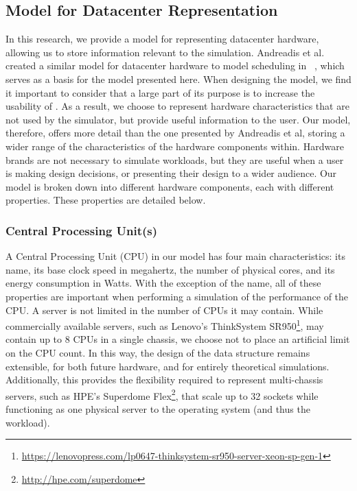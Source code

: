 \documentclass[11pt]{article}
\begin{document}
	\subsection{Model for Datacenter Representation}
		In this research, we provide a model for representing datacenter hardware, allowing us to store information  relevant to the simulation. Andreadis et al. created a similar model for datacenter hardware to model scheduling in \opendc{}~\cite{Andreadis2018}, which serves as a basis for the model presented here. 
		When designing the model, we find it important to consider that a large part of its purpose is to increase the usability of \opendc{}. 
		As a result, we choose to represent hardware characteristics that are not used by the simulator, but provide useful information to the user. 
		Our model, therefore, offers more detail than the one presented by Andreadis et al, storing a wider range of the characteristics of the hardware components within.
		Hardware brands are not necessary to simulate workloads, but they are useful when a user is making design decisions, or presenting their design to a wider audience.
		Our model is broken down into different hardware components, each with different properties.
		These properties are detailed below.

		\subsubsection{Central Processing Unit(s)}
			A Central Processing Unit (CPU) in our model has four main characteristics: its name, its base clock speed in megahertz, the number of physical cores, and its energy consumption in Watts.
			With the exception of the name, all of these properties are important when performing a simulation of the performance of the CPU.
			A server is not limited in the number of CPUs it may contain.
			While commercially available servers, such as Lenovo's ThinkSystem SR950\footnote{\url{https://lenovopress.com/lp0647-thinksystem-sr950-server-xeon-sp-gen-1}}, may contain up to 8 CPUs in a single chassis, we choose not to place an artificial limit on the CPU count.
			In this way, the design of the data structure remains extensible, for both future hardware, and for entirely theoretical simulations.
			Additionally, this provides the flexibility required to represent multi-chassis servers, such as HPE's Superdome Flex\footnote{\url{http://hpe.com/superdome}}, that scale up to 32 sockets while functioning as one physical server to the operating system (and thus the workload).
\end{document}
